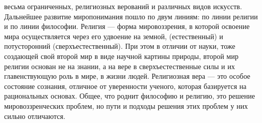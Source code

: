 \documentclass[12pt]{article}
\begin{document}
весьма ограниченных, религиозных верований и различных видов искусств.
Дальнейшее развитие миропонимания пошло по двум линиям: по линии религии и по линии философии.
Религия ---  форма мировоззрения, в которой освоение мира осуществляется через его удвоение на земной,
(естественный) и потусторонний (сверхъестественный). При этом в отличии от науки, тоже создающей свой
второй  мир  в  виде  научной  картины  природы,  второй  мир  религии  основан  не  на  знании,
а  на  вере  в
сверхъестественные силы и их главенствующую роль в мире, в жизни людей. Религиозная вера --- это особое
состояние сознания, отличное от уверенности ученого, которая базируется на рациональных основах.
Общее, что роднит философию и религию, это решение мировоззренческих проблем, но пути и подходы решения
этих проблем у них сильно отличаются.

\newpage
\end{document}
